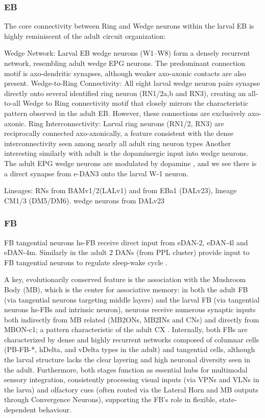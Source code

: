         \subsubsection{EB}
        The core connectivity between Ring and Wedge neurons within the larval EB is highly reminiscent of the adult circuit organization:

        Wedge Network: Larval EB wedge neurons (W1–W8) form a densely recurrent network, resembling adult wedge EPG neurons. The predominant connection motif is axo-dendritic synapses, although weaker axo-axonic contacts are also present.
        Wedge-to-Ring Connectivity: All eight larval wedge neuron pairs synapse directly onto several identified ring neuron (RN1/2a,b and RN3), creating an all-to-all Wedge to Ring connectivity motif that closely mirrors the characteristic pattern observed in the adult EB. However, these connections are exclusively axo-axonic.
         Ring Interconnectivity: Larval ring neurons (RN1/2, RN3) are reciprocally connected axo-axonically, a feature consistent with the dense interconnectivity seen among nearly all adult ring neuron types
         Another interesting similarly with adult is the dopaminergic input into  wedge neurons. The adult EPG wedge neurons are modulated by dopamine \citep{frighetto2022dopamine} , and we see there is a direct synapse from e-DAN3 onto the larval W-1 neuron. 

         Lineages: RNs from BAMv1/2(LALv1) and from EBa1 (DALv23), lineage CM1/3 (DM5/DM6).  wedge neurons from DALv23 
        
        \subsubsection{FB}
        FB tangential neurons hs-FB receive direct input from eDAN-2, eDAN-4l and eDAN-4m. Similarly in the adult 2 DANs (from PPL cluster)  provide input to FB tangential neurons to regulate sleep-wake cycle \citep{liu2012two}. 

        A key, evolutionarily conserved feature is the association with the Mushroom Body (MB), which is the center for associative memory: in both the adult FB (via tangential neurons targeting middle layers) and the larval FB (via tangential neurons hs-FBs and intrinsic neuron), neurons receive numerous synaptic inputs both indirectly from MB related (MB2ONs, MB2INs and CNs) and directly from MBON-c1; a pattern characteristic of the adult CX . Internally, both FBs are characterized by dense and highly recurrent networks composed of columnar cells (PB-FB-*, hDelta, and vDelta types in the adult) and tangential cells, although the larval structure lacks the clear layering and high neuronal diversity seen in the adult. Furthermore, both stages function as essential hubs for multimodal sensory integration, consistently processing visual inputs (via VPNs and VLNs in the larva) and olfactory cues (often routed via the Lateral Horn and MB outputs through Convergence Neurons), supporting the FB's role in flexible, state-dependent behaviour.

